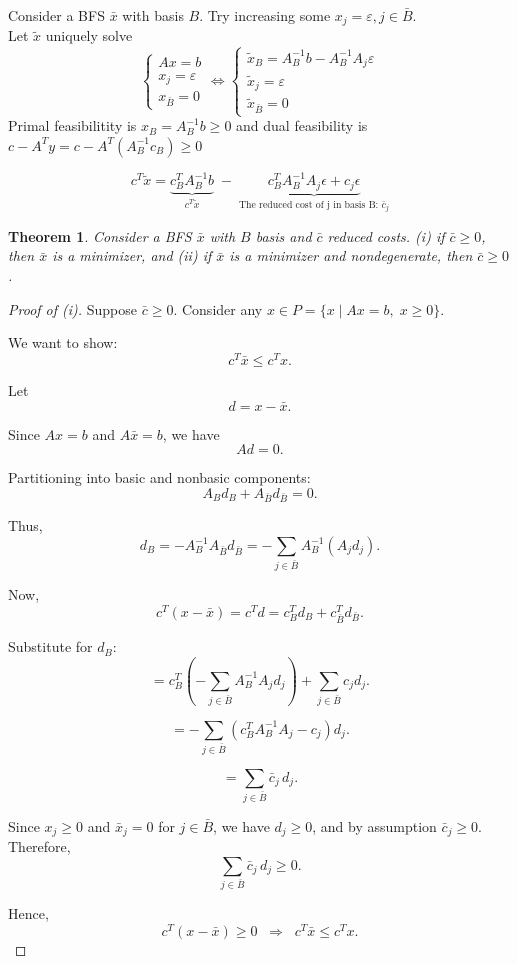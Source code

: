 \documentclass[12pt,oneside]{book}
\numberwithin{equation}{section}
\theoremstyle{definition}
\theoremstyle{plain}
\newtheorem{theorem}{Theorem}[section]
\theoremstyle{remark}
\begin{document}
Consider a BFS $\bar{x}$ with basis $B$. Try increasing some $x_j=\varepsilon, j \in \bar{B}$. \\
\noindent Let $\tilde{x}$ uniquely solve 
$$
\begin{cases}
    Ax=b \\
    x_j = \varepsilon \\
    x_{\bar{B}}=0
\end{cases}
\iff
\begin{cases}
    \tilde{x}_B = A_B^{-1}b - A_B^{-1}A_j \varepsilon\\
    \tilde{x}_j = \varepsilon \\
    \tilde{x}_{\bar{B}}=0
\end{cases}
$$
Primal feasibilitity is $x_B=A_B^{-1}b \ge 0$ and dual feasibility is $c - A^Ty = c-A^T(A_B^{-1}c_B)\ge 0$

\[
c^T \tilde{x} = 
\underbrace{c_B^T A_B^{-1} b}_{c^T \tilde{x}} 
\;-\;
\underbrace{
c_B^T A_B^{-1} A_j \epsilon + c_j \epsilon
}_{\text{The reduced cost of j in basis B: } \bar{c}_j}
\]

\begin{theorem}
    Consider a BFS $\bar{x}$ with $B$ basis and $\bar{c}$ reduced costs. (i) if $\bar{c}\ge 0$, then $\bar{x}$ is a minimizer, and (ii) if $\bar{x}$ is a minimizer and nondegenerate, then $\bar{c}\ge 0$.
\end{theorem}

\begin{proof}[Proof of (i)]
    Suppose $\bar{c} \ge 0$. Consider any $x \in P = \{x \mid Ax = b,\; x \ge 0\}$.
    
    We want to show:
    \[
    c^T \bar{x} \le c^T x.
    \]
    
    Let
    \[
    d = x - \bar{x}.
    \]
    
    Since $Ax = b$ and $A\bar{x} = b$, we have
    \[
    Ad = 0.
    \]
    
    Partitioning into basic and nonbasic components:
    \[
    A_B d_B + A_{\bar{B}} d_{\bar{B}} = 0.
    \]
    
    Thus,
    \[
    d_B = -A_B^{-1} A_{\bar{B}} d_{\bar{B}}
    = -\sum_{j \in \bar{B}} A_B^{-1} (A_j d_j).
    \]
    
    Now,
    \[
    c^T(x - \bar{x}) = c^T d = c_B^T d_B + c_{\bar{B}}^T d_{\bar{B}}.
    \]
    
    Substitute for $d_B$:
    \[
    = c_B^T \left(-\sum_{j \in \bar{B}} A_B^{-1} A_j d_j \right)
    + \sum_{j \in \bar{B}} c_j d_j.
    \]
    
    \[
    = -\sum_{j \in \bar{B}} \left(c_B^T A_B^{-1} A_j - c_j\right) d_j.
    \]
    
    \[
    = \sum_{j \in \bar{B}} \bar{c}_j \, d_j.
    \]
    
    Since $x_j \ge 0$ and $\bar{x}_j = 0$ for $j \in \bar{B}$, we have $d_j \ge 0$, and by assumption $\bar{c}_j \ge 0$. Therefore,
    \[
    \sum_{j \in \bar{B}} \bar{c}_j \, d_j \ge 0.
    \]
    
    Hence,
    \[
    c^T(x - \bar{x}) \ge 0 \;\;\Rightarrow\;\; c^T \bar{x} \le c^T x.
    \]
\end{proof}
\end{document}
